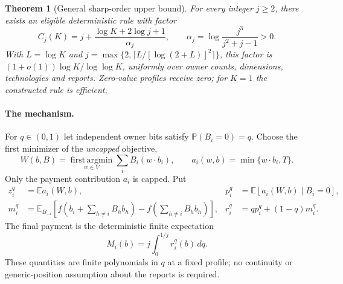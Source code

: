 \documentclass[11pt]{article}
\newtheorem{theorem}{Theorem}[section]
\theoremstyle{definition}\newtheorem{definition}[theorem]{Definition}
\theoremstyle{remark}\newtheorem{remark}[theorem]{Remark}
\newcommand{\E}{\mathbb E}
\newcommand{\Prob}{\mathbb P}
\begin{document}
\begin{theorem}[General sharp-order upper bound]\label{prod:upper}
For every integer $j\ge2$, there exists an eligible deterministic rule with factor
\begin{equation}\label{prod:constant}
 C_j(K)=j+\frac{\log K+2\log j+1}{\alpha_j},\qquad
 \alpha_j=\log\frac{j^3}{j^2+j-1}>0.
\end{equation}
With $L=\log K$ and
$j=\max\{2,\lceil L/[\log(2+L)]^2\rceil\}$, this factor is
$(1+o(1))\log K/\log\log K$, uniformly over owner counts, dimensions,
technologies and reports. Zero-value profiles receive zero; for $K=1$ the
constructed rule is efficient.
\end{theorem}

\paragraph{The mechanism.}
For $q\in(0,1)$ let independent owner bits satisfy $\Prob(B_i=0)=q$.
Choose the first minimizer of the \emph{uncapped} objective,
\[
 W(b,B)=\operatorname*{first\,argmin}_{w\in V}
               \sum_i B_i(w\cdot b_i),\qquad
 a_i(w,b)=\min\{w\cdot b_i,T\}.
\]
Only the payment contribution $a_i$ is capped. Put
\begin{align}
 z_i^q&=\E a_i(W,b),&
 p_i^q&=\E[a_i(W,b)\mid B_i=0],\label{prod:p}\\
 m_i^q&=\E_{B_{-i}}\left[f\left(b_i+\sum_{h\ne i}B_hb_h\right)
                         -f\left(\sum_{h\ne i}B_hb_h\right)\right],
 &r_i^q&=qp_i^q+(1-q)m_i^q.\label{prod:hybrid}
\end{align}
The final payment is the deterministic finite expectation
\begin{equation}\label{prod:payment}
 M_i(b)=j\int_0^{1/j}r_i^q(b)\,dq.
\end{equation}
These quantities are finite polynomials in $q$ at a fixed profile; no
continuity or generic-position assumption about the reports is required.
\end{document}
